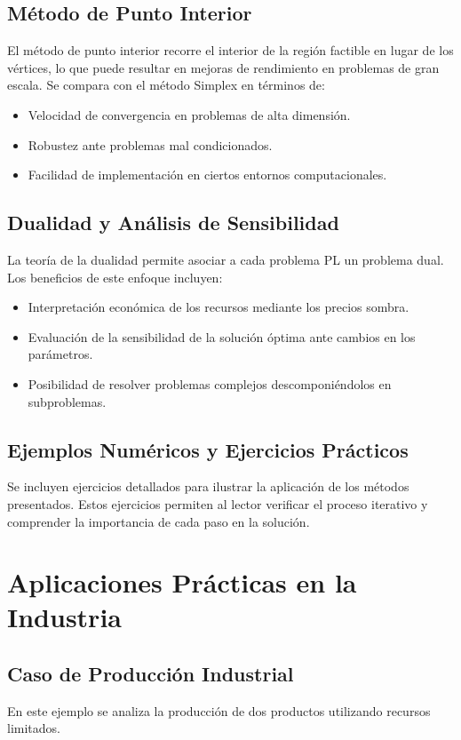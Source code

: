 	\subsection{Método de Punto Interior}
	El método de punto interior recorre el interior de la región factible en lugar de los vértices, lo que puede resultar en mejoras de rendimiento en problemas de gran escala. Se compara con el método Simplex en términos de:
	\begin{itemize}
		\item Velocidad de convergencia en problemas de alta dimensión.
		\item Robustez ante problemas mal condicionados.
		\item Facilidad de implementación en ciertos entornos computacionales.
	\end{itemize}
	
	\subsection{Dualidad y Análisis de Sensibilidad}
	La teoría de la dualidad permite asociar a cada problema PL un problema dual. Los beneficios de este enfoque incluyen:
	\begin{itemize}
		\item Interpretación económica de los recursos mediante los precios sombra.
		\item Evaluación de la sensibilidad de la solución óptima ante cambios en los parámetros.
		\item Posibilidad de resolver problemas complejos descomponiéndolos en subproblemas.
	\end{itemize}
	
	\subsection{Ejemplos Numéricos y Ejercicios Prácticos}
	Se incluyen ejercicios detallados para ilustrar la aplicación de los métodos presentados. Estos ejercicios permiten al lector verificar el proceso iterativo y comprender la importancia de cada paso en la solución.
	\section{Aplicaciones Prácticas en la Industria}
	
	\subsection{Caso de Producción Industrial}
	En este ejemplo se analiza la producción de dos productos utilizando recursos limitados.
	
